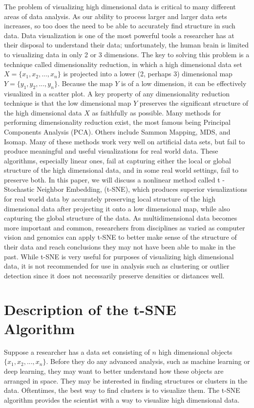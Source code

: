 \documentclass{article}
\begin{document}
The problem of visualizing high dimensional data is critical to many different areas of data analysis. As our ability to process larger and larger data sets increases, so too does the need to be able to accurately find structure in such data. Data visualization is one of the most powerful tools a researcher has at their disposal to understand their data; unfortunately, the human brain is limited to visualizing data in only 2 or 3 dimensions. The key to solving this problem is a technique called dimensionality reduction, in which a high dimensional data set $X = \{x_1, x_2, ... , x_n\}$ is projected into a lower (2, perhaps 3) dimensional map $Y = \{y_1, y_2, ... , y_n\}$. Because the map $Y$ is of a low dimension, it can be effectively visualized in a scatter plot. A key property of any dimensionality reduction technique is that the low dimensional map $Y$ preserves the significant structure of the high dimensional data $X$ as faithfully as possible. Many methods for performing dimensionality reduction exist, the most famous being Principal Components Analysis (PCA). Others include Sammon Mapping, MDS, and Isomap. Many of these methods work very well on artificial data sets, but fail to produce meaningful and useful visualizations for real world data. These algorithms, especially linear ones, fail at capturing either the local or global structure of the high dimensional data, and in some real world settings, fail to preserve both. In this paper, we will discuss a nonlinear method called t - Stochastic Neighbor Embedding, (t-SNE), which produces superior visualizations for real world data by accurately preserving local structure of the high dimensional data after projecting it onto a low dimensional map, while also capturing the global structure of the data. As multidimensional data becomes more important and common, researchers from disciplines as varied as computer vision and genomics can apply t-SNE to better make sense of the structure of their data and reach conclusions they may not have been able to make in the past. While t-SNE is very useful for purposes of visualizing high dimensional data, it is not recommended for use in analysis such as clustering or outlier detection since it does not necessarily preserve densities or distances well.

\section*{Description of the t-SNE Algorithm}

Suppose a researcher has a data set consisting of $n$ high dimensional objects $\{x_1, x_2, ... , x_n\}$. Before they do any advanced analysis, such as machine learning or deep learning, they may want to better understand how these objects are arranged in space. They may be interested in finding structures or clusters in the data. Oftentimes, the best way to find clusters is to visualize them. The t-SNE algorithm provides the scientist with a way to visualize high dimensional data.
\end{document}

